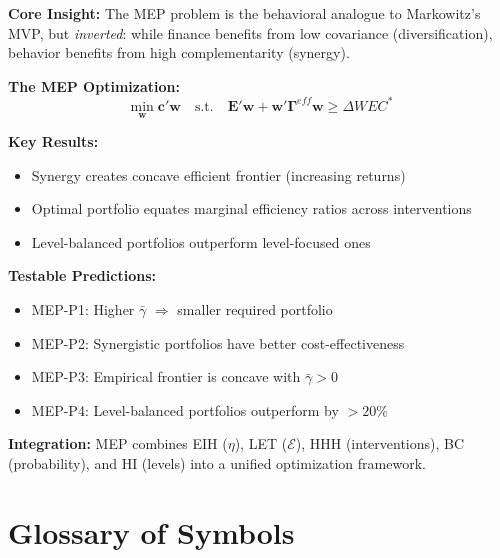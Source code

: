 \begin{tcolorbox}[colback=green!10!white, colframe=green!75!black,
    title=\textbf{Appendix V Summary: The Minimum Effective Portfolio}]

\textbf{Core Insight:}
The MEP problem is the behavioral analogue to Markowitz's MVP, but \textit{inverted}:
while finance benefits from low covariance (diversification), behavior benefits
from high complementarity (synergy).

\textbf{The MEP Optimization:}
\begin{equation*}
\min_{\mathbf{w}} \mathbf{c}'\mathbf{w} \quad \text{s.t.} \quad
\mathbf{E}'\mathbf{w} + \mathbf{w}'\boldsymbol{\Gamma}^{eff}\mathbf{w} \geq \Delta WEC^*
\end{equation*}

\textbf{Key Results:}
\begin{itemize}[nosep]
\item Synergy creates concave efficient frontier (increasing returns)
\item Optimal portfolio equates marginal efficiency ratios across interventions
\item Level-balanced portfolios outperform level-focused ones
\end{itemize}

\textbf{Testable Predictions:}
\begin{itemize}[nosep]
\item MEP-P1: Higher $\bar{\gamma}$ $\Rightarrow$ smaller required portfolio
\item MEP-P2: Synergistic portfolios have better cost-effectiveness
\item MEP-P3: Empirical frontier is concave with $\bar{\gamma} > 0$
\item MEP-P4: Level-balanced portfolios outperform by $>20\%$
\end{itemize}

\textbf{Integration:} MEP combines EIH ($\eta$), LET ($\mathcal{E}$), HHH (interventions),
BC (probability), and HI (levels) into a unified optimization framework.

\end{tcolorbox}


\section{Glossary of Symbols}
\label{sec:mep-glossary}

